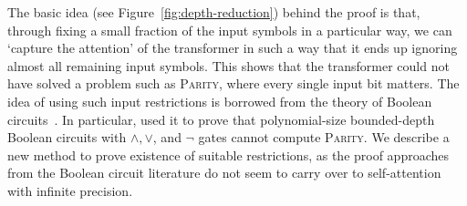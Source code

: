 \documentclass[11pt,a4paper]{article}
\begin{document}
The basic idea (see Figure~\ref{fig:depth-reduction}) behind the proof is that, through fixing a small fraction of the input symbols in a particular way, we can `capture the attention' of the transformer in such a way that it ends up ignoring almost all remaining input symbols.
This shows that the transformer could not have solved a problem such as \textsc{Parity}, where every single input bit matters.
The idea of using such input restrictions is borrowed from the theory of Boolean circuits~\cite{furst1984parity,yao1986separating,hastad1994optimal}.
In particular, \cite{furst1984parity} used it to prove that polynomial-size bounded-depth Boolean circuits with $\wedge, \vee$, and $\neg$ gates cannot compute \textsc{Parity}.
We describe a new method to prove existence of suitable restrictions, as the proof approaches from the Boolean circuit literature do not seem to carry over to self-attention with infinite precision. %




\end{document}
